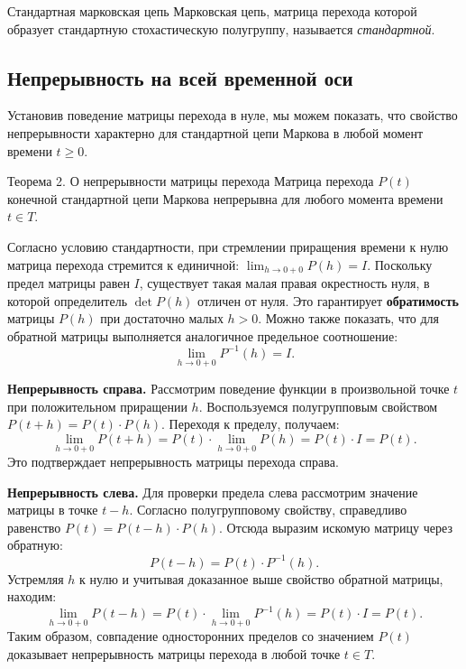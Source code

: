 \begin{definition}{Стандартная марковская цепь}
    Марковская цепь, матрица перехода которой образует стандартную стохастическую полугруппу, называется \textit{стандартной}.
\end{definition}

\subsection{Непрерывность на всей временной оси}

Установив поведение матрицы перехода в нуле, мы можем показать, что свойство непрерывности характерно для стандартной цепи Маркова в любой момент времени $t \geqslant 0$.

\begin{theorem}{Теорема 2. О непрерывности матрицы перехода}
    Матрица перехода $P(t)$ конечной стандартной цепи Маркова непрерывна для любого момента времени $t \in T$.
\end{theorem}

\begin{tproof}
    Согласно условию стандартности, при стремлении приращения времени к нулю матрица перехода стремится к единичной: $\lim_{h \to 0+0} P(h) = I$. Поскольку предел матрицы равен $I$, существует такая малая правая окрестность нуля, в которой определитель $\det P(h)$ отличен от нуля. Это гарантирует \textbf{обратимость} матрицы $P(h)$ при достаточно малых $h > 0$. Можно также показать, что для обратной матрицы выполняется аналогичное предельное соотношение:
    \[
    \lim_{h \to 0+0} P^{-1}(h) = I. %
    \]

    \textbf{Непрерывность справа.}
    Рассмотрим поведение функции в произвольной точке $t$ при положительном приращении $h$. Воспользуемся полугрупповым свойством $P(t+h) = P(t) \cdot P(h)$. Переходя к пределу, получаем:
    \[
    \lim_{h \to 0+0} P(t + h) = P(t) \cdot \lim_{h \to 0+0} P(h) = P(t) \cdot I = P(t). 
    \]
    Это подтверждает непрерывность матрицы перехода справа. 

    \textbf{Непрерывность слева.}
    Для проверки предела слева рассмотрим значение матрицы в точке $t - h$. Согласно полугрупповому свойству, справедливо равенство $P(t) = P(t - h) \cdot P(h)$. Отсюда выразим искомую матрицу через обратную:
    \[
    P(t - h) = P(t) \cdot P^{-1}(h). 
    \]
    Устремляя $h$ к нулю и учитывая доказанное выше свойство обратной матрицы, находим:
    \[
    \lim_{h \to 0+0} P(t - h) = P(t) \cdot \lim_{h \to 0+0} P^{-1}(h) = P(t) \cdot I = P(t). 
    \]
    Таким образом, совпадение односторонних пределов со значением $P(t)$ доказывает непрерывность матрицы перехода в любой точке $t \in T$. 
\end{tproof}

